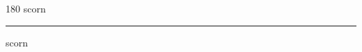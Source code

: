 
\begin{frame}
\begin{center}
\begin{turn}{180}
{\fontsize{2.5cm}{1em}\selectfont scorn}
\end{turn}
\vspace{1em}\par  
\hrule
\vspace{1em}\par  
{\fontsize{2.5cm}{1em}\selectfont scorn}
\end{center}
\end{frame}
